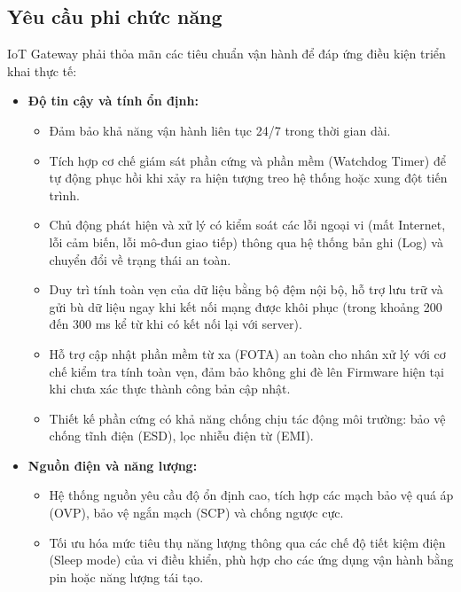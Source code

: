 \subsection{Yêu cầu phi chức năng}
    IoT Gateway phải thỏa mãn các tiêu chuẩn vận hành để đáp ứng điều kiện triển khai thực tế:
    \begin{itemize}
        \item \textbf{Độ tin cậy và tính ổn định:}
        \begin{itemize}
            \item Đảm bảo khả năng vận hành liên tục 24/7 trong thời gian dài.
            \item Tích hợp cơ chế giám sát phần cứng và phần mềm (Watchdog Timer) để tự động phục hồi khi xảy ra hiện tượng treo hệ thống hoặc xung đột tiến trình.
            \item Chủ động phát hiện và xử lý có kiểm soát các lỗi ngoại vi (mất Internet, lỗi cảm biến, lỗi mô-đun giao tiếp) thông qua hệ thống bản ghi (Log) và chuyển đổi về trạng thái an toàn.
            \item Duy trì tính toàn vẹn của dữ liệu bằng bộ đệm nội bộ, hỗ trợ lưu trữ và gửi bù dữ liệu ngay khi kết nối mạng được khôi phục (trong khoảng 200 đến 300 ms kể từ khi có kết nối lại với server).
            \item Hỗ trợ cập nhật phần mềm từ xa (FOTA) an toàn cho nhân xử lý với cơ chế kiểm tra tính toàn vẹn, đảm bảo không ghi đè lên Firmware hiện tại khi chưa xác thực thành công bản cập nhật.
            \item Thiết kế phần cứng có khả năng chống chịu tác động môi trường: bảo vệ chống tĩnh điện (ESD), lọc nhiễu điện từ (EMI).
        \end{itemize}
        
        \item \textbf{Nguồn điện và năng lượng:}
        \begin{itemize}
            \item Hệ thống nguồn yêu cầu độ ổn định cao, tích hợp các mạch bảo vệ quá áp (OVP), bảo vệ ngắn mạch (SCP) và chống ngược cực.
            \item Tối ưu hóa mức tiêu thụ năng lượng thông qua các chế độ tiết kiệm điện (Sleep mode) của vi điều khiển, phù hợp cho các ứng dụng vận hành bằng pin hoặc năng lượng tái tạo.
        \end{itemize}
        

\end{itemize}
